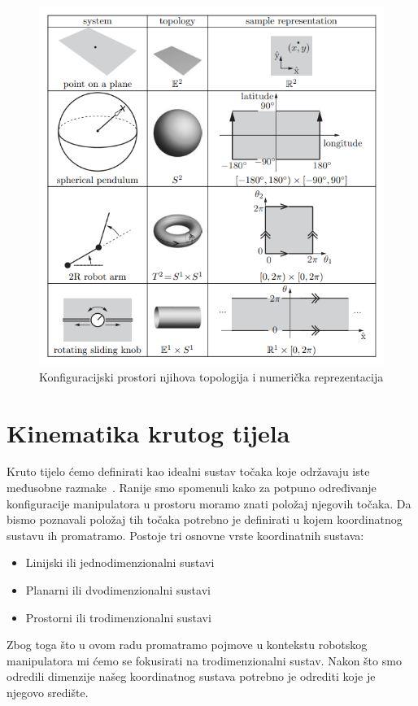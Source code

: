 \documentclass[times, utf8, diplomskirad]{fer}
\begin{document}
\begin{figure}[H]
    \centering
    \includegraphics[width=12cm]{img/configuration-topology}
    \caption{Konfiguracijski prostori njihova topologija i numerička reprezentacija\protect\footnotemark}
    \label{fig:configuration-topology}
\end{figure}

\section{Kinematika krutog tijela} \label{section:kin-krutog-tijela}
Kruto tijelo ćemo definirati kao idealni sustav točaka koje održavaju iste međusobne razmake~\cite{defKrutogTijela}.
Ranije smo spomenuli kako za potpuno određivanje konfiguracije manipulatora u prostoru moramo znati položaj njegovih točaka.
Da bismo poznavali položaj tih točaka potrebno je definirati u kojem koordinatnog sustavu ih promatramo.
Postoje tri osnovne vrste koordinatnih sustava:
\begin{itemize}
  \item Linijski ili jednodimenzionalni sustavi
  \item Planarni ili dvodimenzionalni sustavi
  \item Prostorni ili trodimenzionalni sustavi
\end{itemize}
\newpage
Zbog toga što u ovom radu promatramo pojmove u kontekstu robotskog manipulatora mi ćemo se fokusirati na trodimenzionalni sustav.
Nakon što smo odredili dimenzije našeg koordinatnog sustava potrebno je odrediti koje je njegovo središte.
\end{document}
